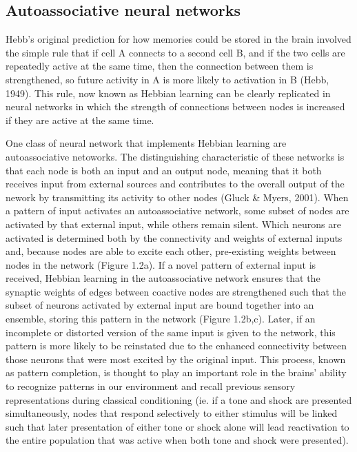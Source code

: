 \documentclass[12pt,a4paperpaper,]{report}
\begin{document}
\subsection{Autoassociative neural
networks}\label{autoassociative-neural-networks}

Hebb's original prediction for how memories could be stored in the brain
involved the simple rule that if cell A connects to a second cell B, and
if the two cells are repeatedly active at the same time, then the
connection between them is strengthened, so future activity in A is more
likely to activation in B (Hebb, 1949). This rule, now known as Hebbian
learning can be clearly replicated in neural networks in which the
strength of connections between nodes is increased if they are active at
the same time.

One class of neural network that implements Hebbian learning are
autoassociative netoworks. The distinguishing characteristic of these
networks is that each node is both an input and an output node, meaning
that it both receives input from external sources and contributes to the
overall output of the nework by transmitting its activity to other nodes
(Gluck \& Myers, 2001). When a pattern of input activates an
autoassociative network, some subset of nodes are activated by that
external input, while others remain silent. Which neurons are activated
is determined both by the connectivity and weights of external inputs
and, because nodes are able to excite each other, pre-existing weights
between nodes in the network (Figure 1.2a). If a novel pattern of
external input is received, Hebbian learning in the autoassociative
network ensures that the synaptic weights of edges between coactive
nodes are strengthened such that the subset of neurons activated by
external input are bound together into an ensemble, storing this pattern
in the network (Figure 1.2b,c). Later, if an incomplete or distorted
version of the same input is given to the network, this pattern is more
likely to be reinstated due to the enhanced connectivity between those
neurons that were most excited by the original input. This process,
known as pattern completion, is thought to play an important role in the
brains' ability to recognize patterns in our environment and recall
previous sensory representations during classical conditioning (ie. if a
tone and shock are presented simultaneously, nodes that respond
selectively to either stimulus will be linked such that later
presentation of either tone or shock alone will lead reactivation to the
entire population that was active when both tone and shock were
presented).
\end{document}
